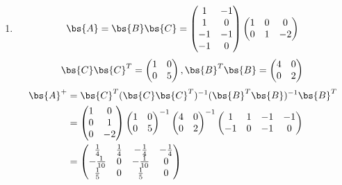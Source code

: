 \documentclass[12pt, a4paper, oneside, UTF8]{ctexbook}
\begin{document}
\begin{solution}
\begin{enumerate}[label=(\arabic*)]
        \item \begin{align*}
            \bs{A}=\bs{B}\bs{C}=\begin{pmatrix}
                1&-1\\
                1&0 \\
                -1&-1\\
                -1&0
            \end{pmatrix}\begin{pmatrix}
                1&0&0\\
                0&1&-2
            \end{pmatrix}
        \end{align*}
        \begin{align*}
            \bs{C}\bs{C}^T=\begin{pmatrix}
                1&0\\
                0&5
            \end{pmatrix},\bs{B}^T\bs{B}=\begin{pmatrix}
                4&0\\
                0&2
            \end{pmatrix}
        \end{align*}
        \begin{align*}
            \bs{A}^+&=\bs{C}^T(\bs{C}\bs{C}^T)^{-1}(\bs{B}^T\bs{B})^{-1}\bs{B}^T\\
            &=\begin{pmatrix}
                1& 0\\
                0&1\\
                0&-2
            \end{pmatrix}\begin{pmatrix}
                1&0\\
                0&5
            \end{pmatrix}^{-1}\begin{pmatrix}
                4&0\\
                0&2
            \end{pmatrix}^{-1}\begin{pmatrix}
                1&1&-1&-1\\
                -1&0&-1&0
            \end{pmatrix}\\
            &=\begin{pmatrix}
                \frac{1}{4}&\frac{1}{4}&-\frac{1}{4}&-\frac{1}{4}\\
                -\frac{1}{10}&0&-\frac{1}{10}&0\\
                \frac{1}{5}&0&\frac{1}{5}&0
            \end{pmatrix}
        \end{align*}
    

\end{enumerate}
\end{solution}
\end{document}
